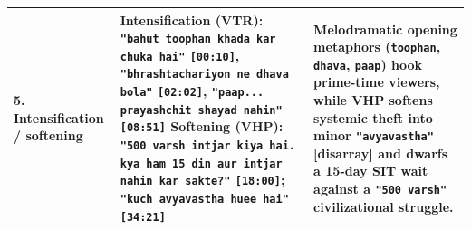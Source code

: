 \documentclass[10pt,a4paper]{article}
\begin{document}
\begin{longtable}{@{}>{\raggedright\arraybackslash}p{} >{\raggedright\arraybackslash}p{} >{\raggedright\arraybackslash}p{}@{}}
\addlinespace[4pt]
\textbf{5. Intensification / softening} & \textbf{Intensification (VTR):} \texttt{"bahut toophan khada kar chuka hai"} \texttt{[00:10]}, \texttt{"bhrashtachariyon ne dhava bola"} \texttt{[02:02]}, \texttt{"paap... prayashchit shayad nahin"} \texttt{[08:51]} \newline  \textbf{Softening (VHP):} \texttt{"500 varsh intjar kiya hai. kya ham 15 din aur intjar nahin kar sakte?"} \texttt{[18:00]}; \texttt{"kuch avyavastha huee hai"} \texttt{[34:21]} & Melodramatic opening metaphors (\texttt{toophan}, \texttt{dhava}, \texttt{paap}) hook prime-time viewers, while VHP softens systemic theft into minor \texttt{"avyavastha"} [disarray] and dwarfs a 15-day SIT wait against a \texttt{"500 varsh"} civilizational struggle. \\
\bottomrule
\end{longtable}
\end{document}
